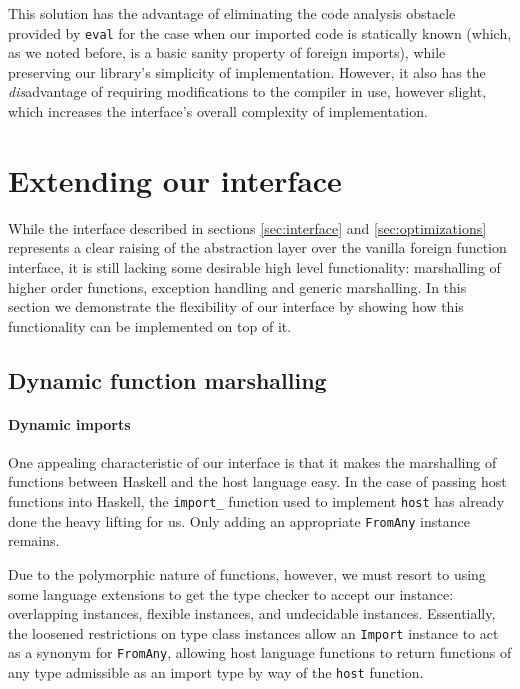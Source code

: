 \documentclass{sigplanconf}
\begin{document}
This solution has the advantage of eliminating the code analysis obstacle
provided by \lstinline!eval! for the case when our imported code is statically
known (which, as we noted before, is a basic sanity property of foreign
imports), while preserving our library's simplicity of implementation.
However, it also has the \emph{dis}advantage of requiring modifications to the
compiler in use, however slight, which increases the interface's overall
complexity of implementation.

\section{Extending our interface}
\label{sec:extensions}
While the interface described in sections \ref{sec:interface} and
\ref{sec:optimizations} represents a clear raising of the abstraction layer
over the vanilla foreign function interface, it is still lacking some
desirable high level functionality: marshalling of higher order functions,
exception handling and generic marshalling.
In this section we demonstrate the flexibility of our interface by showing
how this functionality can be implemented on top of it.

\subsection{Dynamic function marshalling}
\label{sec:marshalling-functions}
\paragraph{Dynamic imports}
One appealing characteristic of our interface is that it makes the marshalling
of functions between Haskell and the host language easy. In the case of
passing host functions into Haskell, the \lstinline!import_! function used to
implement \lstinline!host! has already done the heavy lifting for us.
Only adding an appropriate \lstinline!FromAny! instance remains.

Due to the polymorphic nature of functions, however, we must resort to using
some language extensions to get the type checker to accept our instance:
overlapping instances, flexible instances, and undecidable instances.
Essentially, the loosened restrictions on type class instances allow an
\lstinline!Import! instance to act as a synonym for \lstinline!FromAny!,
allowing host language functions to return functions of any type admissible
as an import type by way of the \lstinline!host! function.
\end{document}
